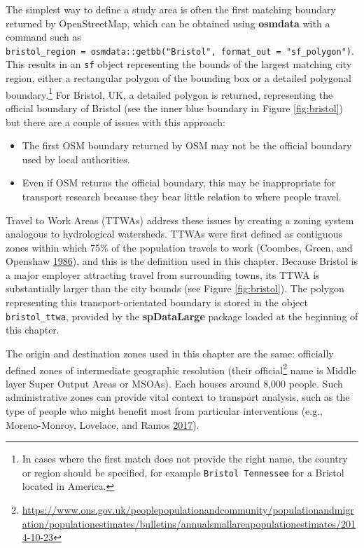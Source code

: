 \documentclass[]{krantz}
\providecommand{\tightlist}{%
  \setlength{\itemsep}{0pt}\setlength{\parskip}{0pt}}
\let\rmarkdownfootnote\footnote%
\def\footnote{\protect\rmarkdownfootnote}
\renewcommand{\href}[2]{#2\footnote{\url{#1}}}
\begin{document}
The simplest way to define a study area is often the first matching boundary returned by OpenStreetMap, which can be obtained using \textbf{osmdata} with a command such as \texttt{bristol\_region\ =\ osmdata::getbb("Bristol",\ format\_out\ =\ "sf\_polygon")}. This results in an \texttt{sf} object representing the bounds of the largest matching city region, either a rectangular polygon of the bounding box or a detailed polygonal boundary.\footnote{In cases where the first match does not provide the right name, the country or region should be specified, for example \texttt{Bristol\ Tennessee} for a Bristol located in America.}
For Bristol, UK, a detailed polygon is returned, representing the official boundary of Bristol (see the inner blue boundary in Figure \ref{fig:bristol}) but there are a couple of issues with this approach:

\begin{itemize}
\tightlist
\item
  The first OSM boundary returned by OSM may not be the official boundary used by local authorities.
\item
  Even if OSM returns the official boundary, this may be inappropriate for transport research because they bear little relation to where people travel.
\end{itemize}

Travel to Work Areas (TTWAs) address these issues by creating a zoning system analogous to hydrological watersheds.
TTWAs were first defined as contiguous zones within which 75\% of the population travels to work (Coombes, Green, and Openshaw \protect\hyperlink{ref-coombes_efficient_1986}{1986}), and this is the definition used in this chapter.
Because Bristol is a major employer attracting travel from surrounding towns, its TTWA is substantially larger than the city bounds (see Figure \ref{fig:bristol}).
The polygon representing this transport-orientated boundary is stored in the object \texttt{bristol\_ttwa}, provided by the \textbf{spDataLarge} package loaded at the beginning of this chapter.

The origin and destination zones used in this chapter are the same: officially defined zones of intermediate geographic resolution (their \href{https://www.ons.gov.uk/peoplepopulationandcommunity/populationandmigration/populationestimates/bulletins/annualsmallareapopulationestimates/2014-10-23}{official} name is Middle layer Super Output Areas or MSOAs).
Each houses around 8,000 people.
Such administrative zones can provide vital context to transport analysis, such as the type of people who might benefit most from particular interventions (e.g., Moreno-Monroy, Lovelace, and Ramos \protect\hyperlink{ref-moreno-monroy_public_2017}{2017}).
\end{document}
